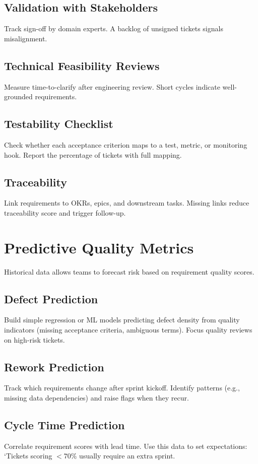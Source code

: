 \subsection{Validation with Stakeholders}
Track sign-off by domain experts. A backlog of unsigned tickets signals misalignment.

\subsection{Technical Feasibility Reviews}
Measure time-to-clarify after engineering review. Short cycles indicate well-grounded requirements.

\subsection{Testability Checklist}
Check whether each acceptance criterion maps to a test, metric, or monitoring hook. Report the percentage of tickets with full mapping.

\subsection{Traceability}
Link requirements to OKRs, epics, and downstream tasks. Missing links reduce traceability score and trigger follow-up.

\section{Predictive Quality Metrics}
\label{sec:predictive-metrics}

Historical data allows teams to forecast risk based on requirement quality scores.

\subsection{Defect Prediction}
Build simple regression or ML models predicting defect density from quality indicators (missing acceptance criteria, ambiguous terms). Focus quality reviews on high-risk tickets.

\subsection{Rework Prediction}
Track which requirements change after sprint kickoff. Identify patterns (e.g., missing data dependencies) and raise flags when they recur.

\subsection{Cycle Time Prediction}
Correlate requirement scores with lead time. Use this data to set expectations: `Tickets scoring $<70\%$ usually require an extra sprint.


